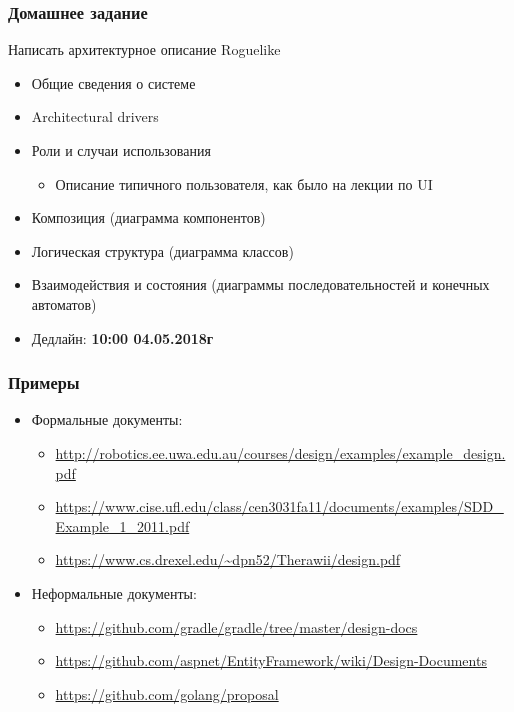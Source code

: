 \documentclass[xetex,mathserif,serif]{beamer}
\begin{document}
	\begin{frame}
		\frametitle{Домашнее задание}
		Написать архитектурное описание Roguelike
		\begin{itemize}
			\item Общие сведения о системе
			\item Architectural drivers
			\item Роли и случаи использования
			\begin{itemize}
				\item Описание типичного пользователя, как было на лекции по UI
			\end{itemize}
			\item Композиция (диаграмма компонентов)
			\item Логическая структура (диаграмма классов)
			\item Взаимодействия и состояния (диаграммы последовательностей и конечных автоматов)
			\item Дедлайн: \textbf{10:00 04.05.2018г}
		\end{itemize}
	\end{frame}

	\begin{frame}
		\frametitle{Примеры}
		\begin{itemize}
			\item Формальные документы:
			\begin{itemize}
				\item \url{http://robotics.ee.uwa.edu.au/courses/design/examples/example\_design.pdf}
				\item \url{https://www.cise.ufl.edu/class/cen3031fa11/documents/examples/SDD\_Example\_1\_2011.pdf}
				\item \url{https://www.cs.drexel.edu/~dpn52/Therawii/design.pdf}
			\end{itemize}
			\item Неформальные документы:
			\begin{itemize}
				\item \url{https://github.com/gradle/gradle/tree/master/design-docs}
				\item \url{https://github.com/aspnet/EntityFramework/wiki/Design-Documents}
				\item \url{https://github.com/golang/proposal}
			\end{itemize}
		\end{itemize}
	\end{frame}
\end{document}
